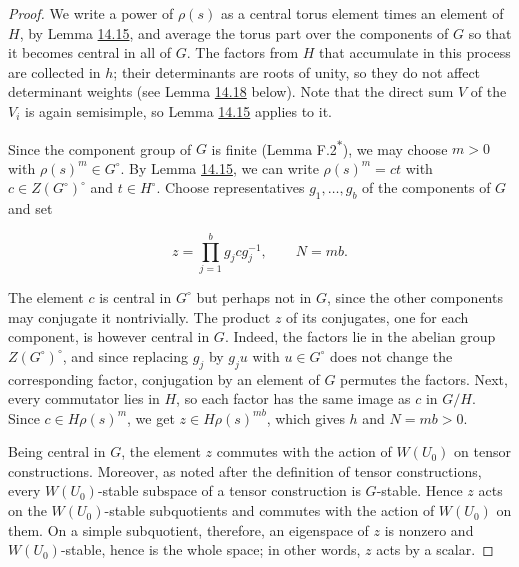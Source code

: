 \documentclass[11pt]{article}
\newcommand{\bpout}[1]{#1\textsuperscript{\hyperlink{bp-outside}{\ensuremath{\ast}}}}
\begin{document}
\begin{proof}[{Proof}]\label{bp55}%
We write a power of \(\rho(s)\) as a central torus element times an element of \(H\), by Lemma \hyperref[bp49]{14.15}, and average the torus part over the components of \(G\) so that it becomes central in all of \(G\). The factors from \(H\) that accumulate in this process are collected in \(h\); their determinants are roots of unity, so they do not affect determinant weights (see Lemma \hyperref[bp58]{14.18} below). Note that the direct sum \(V\) of the \(V_i\) is again semisimple, so Lemma \hyperref[bp49]{14.15} applies to it.

Since the component group of \(G\) is finite (Lemma \bpout{F.2}), we may choose \(m>0\) with \(\rho(s)^m\in G^\circ\). By Lemma \hyperref[bp49]{14.15}, we can write \(\rho(s)^m=ct\) with \(c\in Z(G^\circ)^\circ\) and \(t\in H^\circ\). Choose representatives \(g_1,\ldots,g_b\) of the components of \(G\) and set

\[
z=\prod_{j=1}^bg_jcg_j^{-1},\qquad N=mb.
\]

The element \(c\) is central in \(G^\circ\) but perhaps not in \(G\), since the other components may conjugate it nontrivially. The product \(z\) of its conjugates, one for each component, is however central in \(G\). Indeed, the factors lie in the abelian group \(Z(G^\circ)^\circ\), and since replacing \(g_j\) by \(g_ju\) with \(u\in G^\circ\) does not change the corresponding factor, conjugation by an element of \(G\) permutes the factors. Next, every commutator lies in \(H\), so each factor has the same image as \(c\) in \(G/H\). Since \(c\in H\rho(s)^m\), we get \(z\in H\rho(s)^{mb}\), which gives \(h\) and \(N=mb>0\).

Being central in \(G\), the element \(z\) commutes with the action of \(W(U_0)\) on tensor constructions. Moreover, as noted after the definition of tensor constructions, every \(W(U_0)\)-stable subspace of a tensor construction is \(G\)-stable. Hence \(z\) acts on the \(W(U_0)\)-stable subquotients and commutes with the action of \(W(U_0)\) on them. On a simple subquotient, therefore, an eigenspace of \(z\) is nonzero and \(W(U_0)\)-stable, hence is the whole space; in other words, \(z\) acts by a scalar.
\end{proof}


\end{document}
